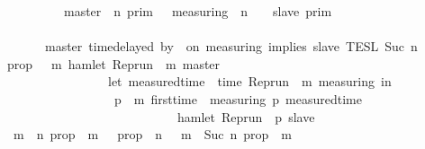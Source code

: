 \begin{isabellebody}
{}\isanewline
\ \ \ \ \ \ \ \ {\isasymunion}\ {\isacharparenleft}{\isasymlbrakk}\ master\ {\isasymUp}\ n\ {\isasymrbrakk}\isactrlsub p\isactrlsub r\isactrlsub i\isactrlsub m\ {\isasyminter}\ {\isasymlbrakk}\ measuring\ {\isacharat}\ n\ {\isasymoplus}\ {\isasymdelta}{\isasymtau}\ {\isasymRightarrow}\ slave\ {\isasymrbrakk}\isactrlsub p\isactrlsub r\isactrlsub i\isactrlsub m{\isacharparenright}{\isacharparenright}\isanewline
\ \ \ \ \ \ \ \ \ \ \ \ \ \ \ \ \ \ \ \ \ \ \ \ \ \ \ \ \ \ \ \ \ \ \ \ \ \ \ \ \ \ \ \ \ %
\isanewline
\ \ \ \ \ {\isasyminter}\ {\isasymlbrakk}\ master\ time{\isacharminus}delayed\ by\ {\isasymdelta}{\isasymtau}\ on\ measuring\ implies\ slave\ {\isasymrbrakk}\isactrlsub T\isactrlsub E\isactrlsub S\isactrlsub L\isactrlbsup {\isasymge}\ Suc\ n\isactrlesup {\isacartoucheclose}\isanewline
%
\isadelimproof
%
\endisadelimproof
%
\isatagproof
{}\isamarkupfalse%
\ {\isacharminus}\isanewline
\ \ \isamarkupfalse%
\ {\isacharquery}prop\ {\isacharequal}\ {\isacartoucheopen}{\isasymlambda}{\isasymrho}\ m{\isachardot}\ hamlet\ {\isacharparenleft}{\isacharparenleft}Rep{\isacharunderscore}run\ {\isasymrho}{\isacharparenright}\ m\ master{\isacharparenright}\ {\isasymlongrightarrow}\isanewline
\ \ \ \ \ \ \ \ \ \ \ \ \ \ \ \ \ {\isacharparenleft}let\ measured{\isacharunderscore}time\ {\isacharequal}\ time\ {\isacharparenleft}{\isacharparenleft}Rep{\isacharunderscore}run\ {\isasymrho}{\isacharparenright}\ m\ measuring{\isacharparenright}\ in\isanewline
\ \ \ \ \ \ \ \ \ \ \ \ \ \ \ \ \ \ {\isasymforall}p\ {\isasymge}\ m{\isachardot}\ first{\isacharunderscore}time\ {\isasymrho}\ measuring\ p\ {\isacharparenleft}measured{\isacharunderscore}time\ {\isacharplus}\ {\isasymdelta}{\isasymtau}{\isacharparenright}\isanewline
\ \ \ \ \ \ \ \ \ \ \ \ \ \ \ \ \ \ \ \ \ \ \ \ \ \ \ {\isasymlongrightarrow}\ hamlet\ {\isacharparenleft}{\isacharparenleft}Rep{\isacharunderscore}run\ {\isasymrho}{\isacharparenright}\ p\ slave{\isacharparenright}{\isacharparenright}{\isacartoucheclose}\isanewline
\ \ \isamarkupfalse%
\ {\isacartoucheopen}{\isacharbraceleft}{\isasymrho}{\isachardot}\ {\isasymforall}m\ {\isasymge}\ n{\isachardot}\ {\isacharquery}prop\ {\isasymrho}\ m{\isacharbraceright}\ {\isacharequal}\ {\isacharbraceleft}{\isasymrho}{\isachardot}\ {\isacharquery}prop\ {\isasymrho}\ n{\isacharbraceright}\ {\isasyminter}\ {\isacharbraceleft}{\isasymrho}{\isachardot}\ {\isasymforall}m\ {\isasymge}\ Suc\ n{\isachardot}\ {\isacharquery}prop\ {\isasymrho}\ m{\isacharbraceright}{\isacartoucheclose}\isanewline

\end{isabellebody}
